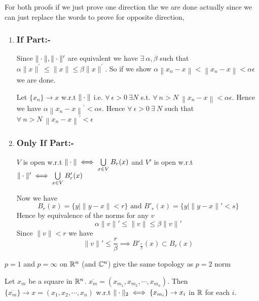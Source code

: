 \begin{myproof}
	For both proofs if we just prove one direction the we are done actually since we can just replace
	the words to prove for opposite direction,
	\begin{enumerate}[label=(\roman*)]
		\item \parinn\subsubsection{If Part:-}
		      Since $\|\cdot\|,\|\cdot\|^{\prime}$ are equivalent we have $\exists\ \alpha, \beta$ such that $\alpha\|x\|^{\prime} \leq\|x\| \leq \beta\|x\|^{\prime}$. So if we show $\alpha\left\|x_{n}-x\right\|<\left\|x_{n}-x\right\|<\alpha \epsilon$ we are done.

		      Let $\{x_{n}\} \to x$ w.r.t $\|\cdot\|$ i.e. $\forall\ \epsilon>0\ \exists N$ s.t. $\forall\ n>N\ \left\|x_{n}-x\right\|<\alpha \epsilon$. Hence we have $\alpha\left\|x_{n}-x\right\|^{\prime}<\alpha \epsilon$. Hence $\forall \ \epsilon>0\ \exists\ N$ such that $\forall\ n>N\ \left\|x_{n}-x\right\|^{\prime}<\epsilon$\Qed

		\item \subsubsection{Only If Part:-}\parinn
		      $V$ is open w.r.t $\|\cdot\|\iff\bigcup\limits_{x\in V}B_r(x)$ and $V'$ is open w.r.t $\|\cdot\|'\iff\bigcup\limits_{x\in V}B'_r(x)$

		      Now we have $$B_r(x)=\{y\mid \|y-x\|<r\}\text{ and } B'_r(x)=\{y\mid \|y-x\|'<s\}$$Hence by equivalence of the norms for any $v$ $$\alpha \|v\|'\leq \|v\|\leq \beta\|v\|'$$ Since $\|v\|<r$ we have $$\|v\|'\leq \frac{r}{\beta}\implies B'_{\frac{r}{\beta}}(x)\subset B_r(x)$$
	\end{enumerate}

\end{myproof}
\begin{corollary}{}{}
	$p=1$ and $p=\infty$ on $\mathbb{R}^n$ (and $\mathbb{C}^n$) give the same topology as $p=2$ norm
\end{corollary}
\begin{corollary}{}{}
	Let $x_m$ be a square in $\mathbb{R}^n$. $\overline{x_m}=(x_{m_1},x_{m_2},\cdots,x_{m_n})$. Then $\{\overline{x_m}\}\to x=(x_1,x_2,\cdots,x_n)$ w.r.t $\|\cdot\|_2\iff \{x_{m_i}\}\to x_i$ in $\mathbb{R}$ for each $i$.
\end{corollary}
